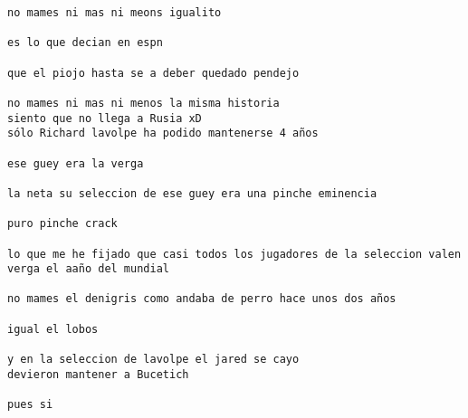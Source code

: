 \begin{verbatim}
no mames ni mas ni meons igualito

es lo que decian en espn

que el piojo hasta se a deber quedado pendejo

no mames ni mas ni menos la misma historia
siento que no llega a Rusia xD
sólo Richard lavolpe ha podido mantenerse 4 años

ese guey era la verga

la neta su seleccion de ese guey era una pinche eminencia

puro pinche crack

lo que me he fijado que casi todos los jugadores de la seleccion valen verga el aaño del mundial

no mames el denigris como andaba de perro hace unos dos años

igual el lobos

y en la seleccion de lavolpe el jared se cayo
devieron mantener a Bucetich

pues si
\end{verbatim}
